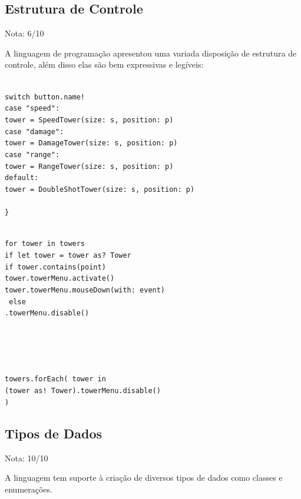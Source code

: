 \documentclass[rel_mlp]{iiufrgs}
\newcommand\tab[1][1cm]{\hspace*{#1}}
\begin{document}
\subsection{Estrutura de Controle}

Nota: 6/10

A linguagem de programação apresentou uma variada disposição de estrutura de controle, além disso elas são bem expressivas e legíveis:

\texttt{
\\switch button.name! {
\\\tab case "speed":
\\\tab\tab tower = SpeedTower(size: s, position: p)
\\\tab case "damage":
\\\tab\tab tower = DamageTower(size: s, position: p)
\\\tab case "range":
\\\tab\tab tower = RangeTower(size: s, position: p)
\\\tab default:
\\\tab\tab tower = DoubleShotTower(size: s, position: p)
\\\tab }
\\\}
}

\texttt{
\\for tower in towers {
\\\tab if let tower = tower as? Tower {
\\\tab\tab if tower.contains(point) {
\\\tab\tab\tab tower.towerMenu.activate()
\\\tab\tab\tab tower.towerMenu.mouseDown(with: event)
\\\tab\tab} else {
\\\tab\tab\tabtower.towerMenu.disable()
\\\tab\tab}
\\\tab}
\\}
}

\texttt{
\\towers.forEach({ tower in
\\\tab (tower as! Tower).towerMenu.disable()
\\})
}


\subsection{Tipos de Dados}

Nota: 10/10

A linguagem tem suporte à criação de diversos tipos de dados como classes e enumerações.
\end{document}
